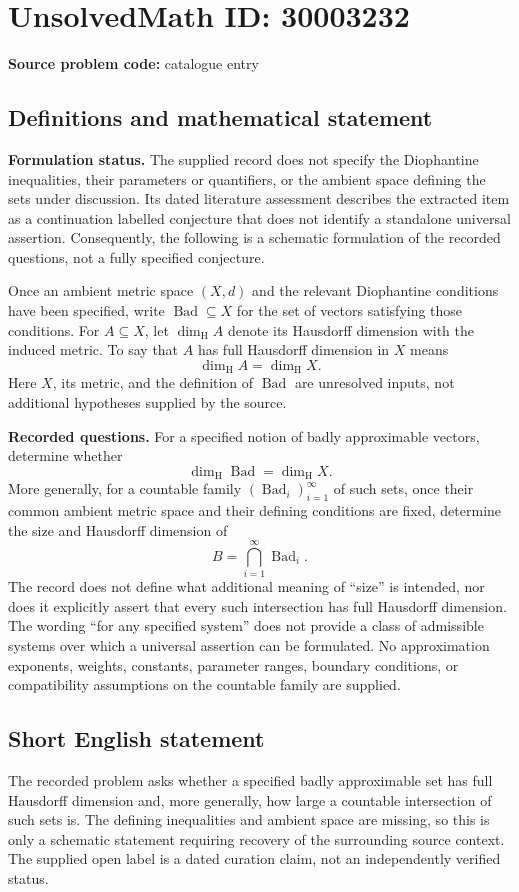 \documentclass[11pt]{article}
\begin{document}
\section*{UnsolvedMath ID: 30003232}
\textbf{Source problem code:} catalogue entry
\subsection{Definitions and mathematical statement}
\textbf{Formulation status.} The supplied record does not specify the Diophantine inequalities, their parameters or quantifiers, or the ambient space defining the sets under discussion. Its dated literature assessment describes the extracted item as a continuation labelled conjecture that does not identify a standalone universal assertion. Consequently, the following is a schematic formulation of the recorded questions, not a fully specified conjecture.

Once an ambient metric space \((X,d)\) and the relevant Diophantine conditions have been specified, write \(\operatorname{Bad}\subseteq X\) for the set of vectors satisfying those conditions. For \(A\subseteq X\), let \(\dim_{\mathrm H}A\) denote its Hausdorff dimension with the induced metric. To say that \(A\) has full Hausdorff dimension in \(X\) means
\[
\dim_{\mathrm H}A=\dim_{\mathrm H}X.
\]
Here \(X\), its metric, and the definition of \(\operatorname{Bad}\) are unresolved inputs, not additional hypotheses supplied by the source.

\textbf{Recorded questions.} For a specified notion of badly approximable vectors, determine whether
\[
\dim_{\mathrm H}\operatorname{Bad}=\dim_{\mathrm H}X.
\]
More generally, for a countable family \((\operatorname{Bad}_i)_{i=1}^{\infty}\) of such sets, once their common ambient metric space and their defining conditions are fixed, determine the size and Hausdorff dimension of
\[
B=\bigcap_{i=1}^{\infty}\operatorname{Bad}_i.
\]
The record does not define what additional meaning of ``size'' is intended, nor does it explicitly assert that every such intersection has full Hausdorff dimension. The wording ``for any specified system'' does not provide a class of admissible systems over which a universal assertion can be formulated. No approximation exponents, weights, constants, parameter ranges, boundary conditions, or compatibility assumptions on the countable family are supplied.
\subsection{Short English statement}
The recorded problem asks whether a specified badly approximable set has full Hausdorff dimension and, more generally, how large a countable intersection of such sets is. The defining inequalities and ambient space are missing, so this is only a schematic statement requiring recovery of the surrounding source context. The supplied open label is a dated curation claim, not an independently verified status.
\end{document}
